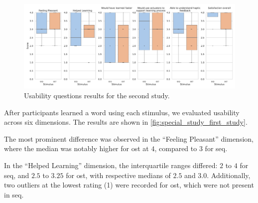 \begin{figure}
    \centering
    \includegraphics[width=0.5\linewidth]{src/pictures/Study2Data_questionnaire/self_evaluation.pdf}
    \caption{Usability questions results for the second study.}
    \label{fig:special_study_second_study}
\end{figure}


After participants learned a word using each stimulus, we evaluated usability across six dimensions. The results are shown in \autoref{fig:special_study_first_study}.

The most prominent difference was observed in the \enquote{Feeling Pleasant} dimension, where the median was notably higher for \gls{ost} at $4$, compared to $3$ for \gls{seq}. 

In the \enquote{Helped Learning} dimension, the interquartile ranges differed: $2$ to $4$ for \gls{seq}, and $2.5$ to $3.25$ for \gls{ost}, with respective medians of $2.5$ and $3.0$. Additionally, two outliers at the lowest rating (1) were recorded for \gls{ost}, which were not present in \gls{seq}. 

